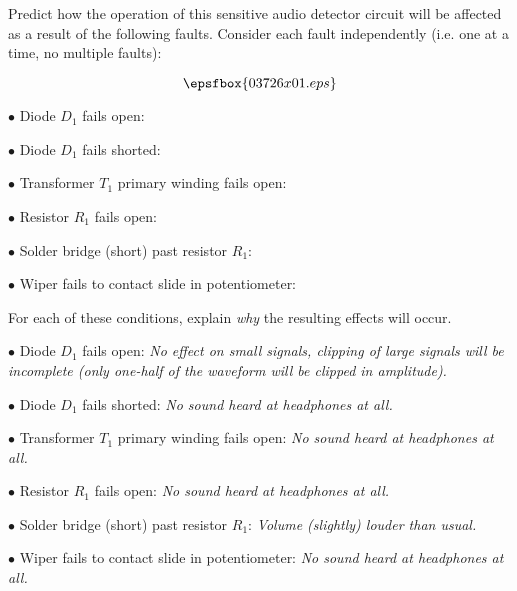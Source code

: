 

Predict how the operation of this sensitive audio detector circuit will be affected as a result of the following faults.  Consider each fault independently (i.e. one at a time, no multiple faults):

$$\epsfbox{03726x01.eps}$$

\medskip
\item{$\bullet$} Diode $D_1$ fails open:
\vskip 5pt
\item{$\bullet$} Diode $D_1$ fails shorted:
\vskip 5pt
\item{$\bullet$} Transformer $T_1$ primary winding fails open:
\vskip 5pt
\item{$\bullet$} Resistor $R_1$ fails open:
\vskip 5pt
\item{$\bullet$} Solder bridge (short) past resistor $R_1$:
\vskip 5pt
\item{$\bullet$} Wiper fails to contact slide in potentiometer:
\medskip

For each of these conditions, explain {\it why} the resulting effects will occur.







\medskip
\item{$\bullet$} Diode $D_1$ fails open: {\it No effect on small signals, clipping of large signals will be incomplete (only one-half of the waveform will be clipped in amplitude).}
\vskip 5pt
\item{$\bullet$} Diode $D_1$ fails shorted: {\it No sound heard at headphones at all.}
\vskip 5pt
\item{$\bullet$} Transformer $T_1$ primary winding fails open: {\it No sound heard at headphones at all.}
\vskip 5pt
\item{$\bullet$} Resistor $R_1$ fails open: {\it No sound heard at headphones at all.}
\vskip 5pt
\item{$\bullet$} Solder bridge (short) past resistor $R_1$: {\it Volume (slightly) louder than usual.}
\vskip 5pt
\item{$\bullet$} Wiper fails to contact slide in potentiometer: {\it No sound heard at headphones at all.}
\medskip

